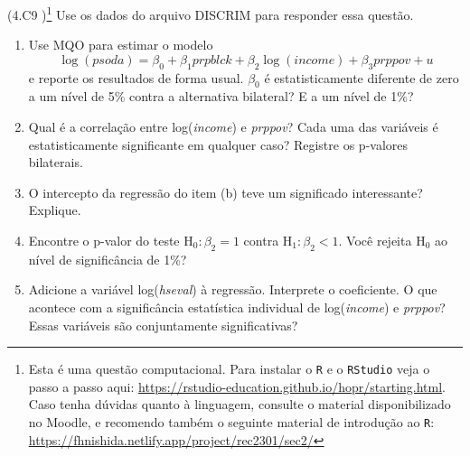 \documentclass[12pt,letterpaper, onecolumn]{exam}
\begin{document}
\begin{questions}
\question\qstar (4.C9 \citep{wooldridge2016})\footnote{Esta é uma questão computacional. Para instalar o \texttt{R} e o \texttt{RStudio} veja o passo a passo aqui: \href{https://rstudio-education.github.io/hopr/starting.html}{https://rstudio-education.github.io/hopr/starting.html}. Caso tenha dúvidas quanto à linguagem, consulte o material disponibilizado no Moodle, e recomendo também o seguinte material de introdução ao \texttt{R}: \href{https://fhnishida.netlify.app/project/rec2301/sec2/}{https://fhnishida.netlify.app/project/rec2301/sec2/} }
Use os dados do arquivo DISCRIM para responder essa questão.
    \begin{enumerate} [label = (\alph*)]
\item Use MQO para estimar o modelo\begin{equation*}
    \log(psoda) = \beta_0 + \beta_1prpblck + \beta_2\log(income) + \beta_3 prppov + u
\end{equation*} e reporte os resultados de forma usual. $\beta_0$ é estatisticamente diferente de zero a um nível de 5\% contra a alternativa bilateral? E a um nível de 1\%?
\item Qual é a correlação entre log(\textit{income}) e \textit{prppov}? Cada uma das variáveis é estatisticamente significante em qualquer caso? Registre os p-valores bilaterais.
\item O intercepto da regressão do item (b) teve um significado interessante? Explique.
\item Encontre o p-valor do teste $\text{H}_0: \beta_2 =1$ contra $\text{H}_1: \beta_2 <1$. Você rejeita  $\text{H}_0$ ao nível de significância de 1\%?
\item Adicione a variável log(\textit{hseval}) à regressão. Interprete o coeficiente. O que acontece com a significância estatística individual de log(\textit{income}) e \textit{prppov}? Essas variáveis são conjuntamente significativas?
    \end{enumerate}
    
\end{questions}
\newpage

\end{document}
